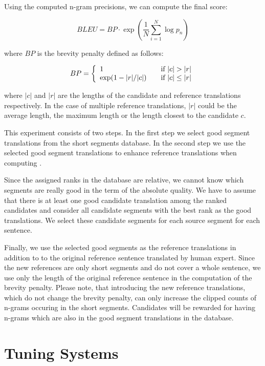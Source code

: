 \noindent Using the computed n-gram precisions, we can compute the final
 score:

\begin{equation*}
        BLEU = BP \cdot \exp \left( \frac{1}{N} \sum_{i = 1}^N \log p_n \right) 
\end{equation*}

\noindent
where $BP$ is the brevity penalty defined as follows:

\begin{equation*}
    BP = \left\{ 
  \begin{array}{l l}
    1 & \quad \text{if } |c| > |r|\\
    \exp(1-|r|/|c|) & \quad \text{if } |c| \leq |r| \\
    \end{array} \right.
\end{equation*}

\noindent where $|c|$ and $|r|$ are the lengths of the candidate and reference
translations respectively. In the case of multiple reference translations,
$|r|$ could be the average length, the maximum length or the length closest to
the candidate $c$.

This experiment consists of two steps. In the first step we select good segment
translations from the short segments database. In the second step we use the
selected good segment translations to enhance reference translations when
computing .

Since the assigned ranks in the database are relative, we cannot know which
segments are really good in the term of the absolute quality. We have to assume
that there is at least one good candidate translation among the ranked
candidates and consider all candidate segments with the best rank as the good
translations. We select these candidate segments for each source segment for
each sentence.

Finally, we use the selected good segments as the reference translations in
addition to to the original reference sentence translated by human expert.
Since the new references are only short segments and do not cover a whole
sentence, we use only the length of the original reference sentence in the
computation of the brevity penalty. Please note, that introducing the new
reference translations, which do not change the brevity penalty, can only
increase the clipped counts of n-grams occuring in the short segments.
Candidates will be rewarded for having n-grams which are also in the good
segment translations in the database.















\section{Tuning Systems}
\label{tuning-systems}


